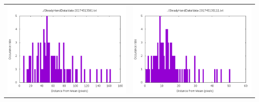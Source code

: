 \documentclass[10pt,letterpaper]{article}
\begin{document}
\begin{table}
\begin{tabular}{cc}
\includegraphics[scale=.5]{graph-data-20174513581.png} & \includegraphics[scale=.5]{graph-data-201745135111.png}\\

\end{tabular}
\end{table}
\end{document}
